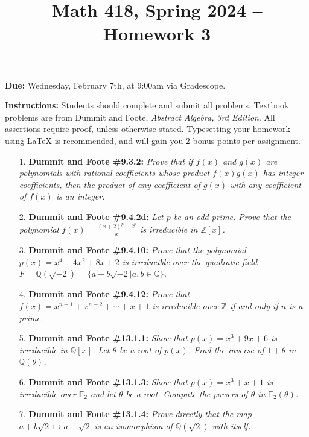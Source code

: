 \documentclass[12pt]{article}
\title{Math 418, Spring 2024 -- Homework 3}
\date{}
\newcommand{\Z}{\mathbb{Z}}
\newcommand{\Q}{\mathbb{Q}}
\newcommand{\F}{\mathbb{F}}
\begin{document}
 \maketitle
\vspace{-80pt}

\textbf{Due:} Wednesday, February 7th, at 9:00am via Gradescope.

\textbf{Instructions:} Students should complete and submit all problems. Textbook problems are from Dummit and Foote, \emph{Abstract Algebra, 3rd Edition}. All assertions require proof, unless otherwise stated. Typesetting your homework using LaTeX is recommended, and will gain you 2 bonus points per assignment.

\begin{enumerate}

\item[1.] \textbf{Dummit and Foote \#9.3.2:} \textit{Prove that if $f(x)$ and $g(x)$ are polynomials with rational coefficients whose product $f(x)g(x)$ has integer coefficients, then the product of any coefficient of $g(x)$ with any coefficient of $f(x)$ is an integer.}

\item[2.] \textbf{Dummit and Foote \#9.4.2d:} \textit{Let $p$ be an odd prime. Prove that the polynomial $f(x) = \frac{(x+2)^p - 2^p}{x}$ is irreducible in $\Z[x]$.}

\item[3.] \textbf{Dummit and Foote \#9.4.10:} \textit{Prove that the polynomial $p(x) = x^4 - 4x^2 + 8x + 2$ is irreducible over the quadratic field $F = \Q(\sqrt{-2}) = \{a + b\sqrt{-2} | a, b \in \Q\}$.}

\item[4.] \textbf{Dummit and Foote \#9.4.12:} \textit{Prove that $f(x) = x^{n-1} + x^{n-2} + \cdots + x + 1$ is irreducible over $\Z$ if and only if $n$ is a prime.}

\item[5.] \textbf{Dummit and Foote \#13.1.1:} \textit{Show that $p(x) = x^3 + 9x +6$ is irreducible in $\Q[x]$. Let $\theta$ be a root of $p(x)$. Find the inverse of $1+\theta$ in $\Q(\theta)$.}

\item[6.] \textbf{Dummit and Foote \#13.1.3:} \textit{Show that $p(x) = x^3+x+1$ is irreducible over $\F_2$ and let $\theta$ be a root. Compute the powers of $\theta$ in $\F_2(\theta)$.}

\item[7.] \textbf{Dummit and Foote \#13.1.4:} \textit{Prove directly that the map $a+b\sqrt{2}\mapsto a-\sqrt{2}$ is an isomorphism of $\Q(\sqrt{2})$ with itself.}

\end{enumerate}
\end{document}
